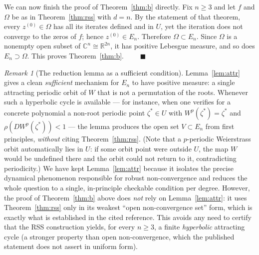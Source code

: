 \documentclass{amsart}
\theoremstyle{definition}
\theoremstyle{remark}
\newtheorem{remark}{Remark}
\newcommand{\C}{\mathbb{C}}
\newcommand{\R}{\mathbb{R}}
\begin{document}
We can now finish the proof of Theorem~\ref{thm:b} directly. Fix $n\ge3$ and let $f$ and
$\Omega$ be as in Theorem~\ref{thm:rss} with $d=n$. By the statement of that theorem, every
$z^{(0)}\in\Omega$ has all its iterates defined and in $U$, yet the iteration does not converge
to the zeros of $f$; hence $z^{(0)}\in E_n$. Therefore $\Omega\subset E_n$. Since $\Omega$ is
a nonempty open subset of $\C^n\cong\R^{2n}$, it has positive Lebesgue measure, and so does
$E_n\supset\Omega$. This proves Theorem~\ref{thm:b}. $\qquad\blacksquare$

\begin{remark}[The reduction lemma as a sufficient condition]\label{rem:reduction}
Lemma~\ref{lem:attr} gives a clean \emph{sufficient} mechanism for $E_n$ to have positive
measure: a single attracting periodic orbit of $W$ that is not a permutation of the roots.
Whenever such a hyperbolic cycle is available --- for instance, when one verifies for a
concrete polynomial a non-root periodic point $\zeta^{*}\in U$ with $W^p(\zeta^{*})=\zeta^{*}$
and $\rho(DW^{p}(\zeta^{*}))<1$ --- the lemma produces the open set $V\subset E_n$ from first
principles, \emph{without} citing Theorem~\ref{thm:rss}. (Note that a $p$-periodic Weierstrass
orbit automatically lies in $U$: if some orbit point were outside $U$, the map $W$ would be
undefined there and the orbit could not return to it, contradicting periodicity.) We have kept
Lemma~\ref{lem:attr} because it isolates the precise dynamical phenomenon responsible for
robust non-convergence and reduces the whole question to a single, in-principle checkable
condition per degree. However, the proof of Theorem~\ref{thm:b} above does \emph{not} rely on
Lemma~\ref{lem:attr}: it uses Theorem~\ref{thm:rss} only in its weakest ``open
non-convergence set'' form, which is exactly what is established in the cited reference. This
avoids any need to certify that the RSS construction yields, for every $n\ge3$, a finite
\emph{hyperbolic} attracting cycle (a stronger property than open non-convergence, which the
published statement does not assert in uniform form).
\end{remark}
\end{document}
